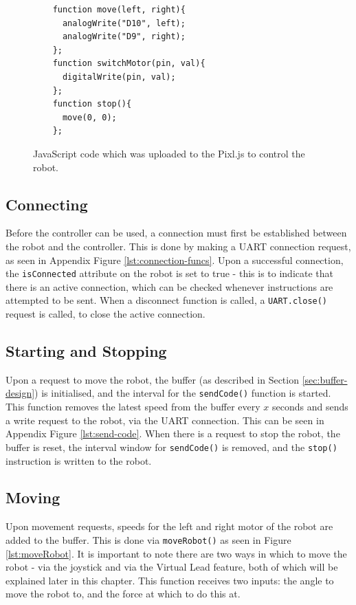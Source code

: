 \documentclass{l4proj}
\begin{document}
\begin{figure}[!h]
    \centering
    \begin{lstlisting}
    function move(left, right){
      analogWrite("D10", left);
      analogWrite("D9", right);
    };
    function switchMotor(pin, val){
      digitalWrite(pin, val);
    };
    function stop(){
      move(0, 0);
    };
    \end{lstlisting}
    \caption{JavaScript code which was uploaded to the Pixl.js to control the robot.}
    \label{lst:robot-code}
\end{figure}

\subsection{Connecting}
Before the controller can be used, a connection must first be established between the robot and the controller. This is done by making a UART connection request, as seen in Appendix Figure \ref{lst:connection-funcs}. Upon a successful connection, the \lstinline{isConnected} attribute on the robot is set to true - this is to indicate that there is an active connection, which can be checked whenever instructions are attempted to be sent. When a disconnect function is called, a \lstinline{UART.close()} request is called, to close the active connection.

\subsection{Starting and Stopping}
Upon a request to move the robot, the buffer (as described in Section \ref{sec:buffer-design}) is initialised, and the interval for the \lstinline{sendCode()} function is started. This function removes the latest speed from the buffer every $x$ seconds and sends a write request to the robot, via the UART connection. This can be seen in Appendix Figure \ref{lst:send-code}. When there is a request to stop the robot, the buffer is reset, the interval window for \lstinline{sendCode()} is removed, and the \lstinline{stop()} instruction is written to the robot.


\subsection{Moving}
Upon movement requests, speeds for the left and right motor of the robot are added to the buffer. This is done via \lstinline{moveRobot()} as seen in Figure \ref{lst:moveRobot}. It is important to note there are two ways in which to move the robot - via the joystick and via the Virtual Lead feature, both of which will be explained later in this chapter. This function receives two inputs: the angle to move the robot to, and the force at which to do this at. 
\end{document}
